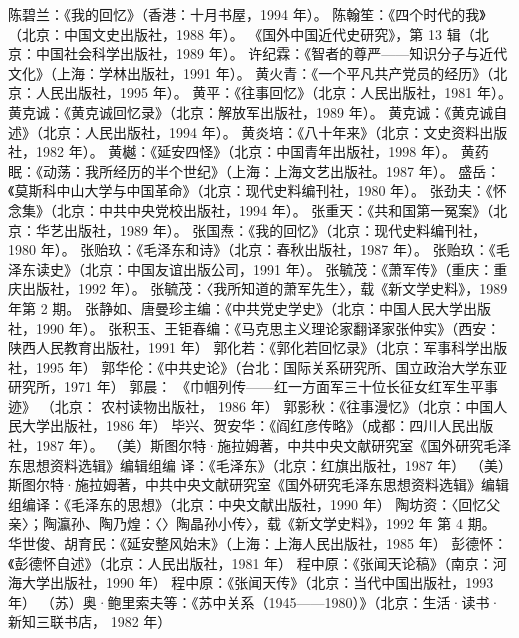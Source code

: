 \begin{thebibliography}{999}
\bibitem{} 陈碧兰：《我的回忆》（香港：十月书屋，1994 年）。
\bibitem{} 陈翰笙：《四个时代的我》（北京：中国文史出版社，1988 年）。
\bibitem{} 《国外中国近代史研究》，第 13 辑（北京：中国社会科学出版社，1989 年）。
\bibitem{} 许纪霖：《智者的尊严——知识分子与近代文化》（上海：学林出版社，1991 年）。
\bibitem{} 黄火青：《一个平凡共产党员的经历》（北京：人民出版社，1995 年）。
\bibitem{} 黄平：《往事回忆》（北京：人民出版社，1981 年）。
\bibitem{} 黄克诚：《黄克诚回忆录》（北京：解放军出版社，1989 年）。
\bibitem{} 黄克诚：《黄克诚自述》（北京：人民出版社，1994 年）。
\bibitem{} 黄炎培：《八十年来》（北京：文史资料出版社，1982 年）。
\bibitem{} 黄樾：《延安四怪》（北京：中国青年出版社，1998 年）。
\bibitem{} 黄药眠：《动荡：我所经历的半个世纪》（上海：上海文艺出版社。1987 年）。
\bibitem{} 盛岳：《莫斯科中山大学与中国革命》（北京：现代史料编刊社，1980 年）。
\bibitem{} 张劲夫：《怀念集》（北京：中共中央党校出版社，1994 年）。
\bibitem{} 张重天：《共和国第一冤案》（北京：华艺出版社，1989 年）。
\bibitem{} 张国焘：《我的回忆》（北京：现代史料编刊社，1980 年）。
\bibitem{} 张贻玖：《毛泽东和诗》（北京：春秋出版社，1987 年）。
\bibitem{} 张贻玖：《毛泽东读史》（北京：中国友谊出版公司，1991 年）。
\bibitem{} 张毓茂：《萧军传》（重庆：重庆出版社，1992 年）。
\bibitem{} 张毓茂：〈我所知道的萧军先生〉，载《新文学史料》，1989 年第 2 期。
\bibitem{} 张静如、唐曼珍主编：《中共党史学史》（北京：中国人民大学出版社，1990 年）。
\bibitem{} 张积玉、王钜春编：《马克思主义理论家翻译家张仲实》（西安：陕西人民教育出版社，1991 年）
\bibitem{} 郭化若：《郭化若回忆录》（北京：军事科学出版社，1995 年）
\bibitem{} 郭华伦：《中共史论》（台北：国际关系研究所、国立政治大学东亚研究所，1971 年）
\bibitem{} 郭晨： 《巾帼列传——红一方面军三十位长征女红军生平事迹》 （北京： 农村读物出版社， 1986 年）
\bibitem{} 郭影秋：《往事漫忆》（北京：中国人民大学出版社，1986 年）
\bibitem{} 毕兴、贺安华：《阎红彦传略》（成都：四川人民出版社，1987 年）。
\bibitem{} （美）斯图尔特·施拉姆著，中共中央文献研究室《国外研究毛泽东思想资料选辑》编辑组编 译：《毛泽东》（北京：红旗出版社，1987 年）
\bibitem{} （美）斯图尔特·施拉姆著，中共中央文献研究室《国外研究毛泽东思想资料选辑》编辑组编译：《毛泽东的思想》（北京：中央文献出版社，1990 年）
\bibitem{} 陶坊资：〈回忆父亲〉；陶瀛孙、陶乃煌：〈〉陶晶孙小传〉，载《新文学史料》，1992 年 第 4 期。
\bibitem{} 华世俊、胡育民：《延安整风始末》（上海：上海人民出版社，1985 年）
\bibitem{} 彭德怀：《彭德怀自述》（北京：人民出版社，1981 年）
\bibitem{} 程中原：《张闻天论稿》（南京：河海大学出版社，1990 年）
\bibitem{} 程中原：《张闻天传》（北京：当代中国出版社，1993 年）
\bibitem{} （苏）奥·鲍里索夫等：《苏中关系（1945——1980）》（北京：生活·读书·新知三联书店， 1982 年）

\end{thebibliography}
